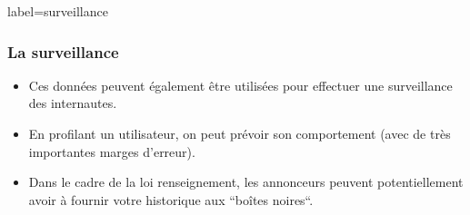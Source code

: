 \documentclass{beamer}
\begin{document}
        \begin{frame}{label=surveillance}
            \frametitle{La surveillance}
            \begin{center}
                \begin{itemize}
                    \item Ces données peuvent également être utilisées pour effectuer une surveillance des internautes.
                    \pause
                    \item En profilant un utilisateur, on peut prévoir son comportement (avec de très importantes marges d'erreur).
                    \pause
                    \item Dans le cadre de la loi renseignement, les annonceurs peuvent potentiellement avoir à fournir votre historique aux ``boîtes noires``.
                \end{itemize}
            \end{center}
        \end{frame}
\end{document}
